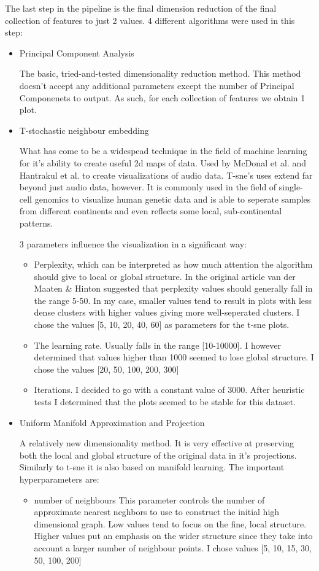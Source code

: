 \documentclass[11pt]{article}
\begin{document}
The last step in the pipeline is the final dimension reduction of the final collection of features to just 2 values. 4 different algorithms were used in this step:
\begin{itemize}
\item Principal Component Analysis

The basic, tried-and-tested dimensionality reduction method. This method doesn't accept any additional parameters except the number of Principal Componenets to output. As such, for each collection of features we obtain 1 plot.
\item T-stochastic neighbour embedding

What has come to be a widespead technique in the field of machine learning for it's ability to create useful 2d maps of data. Used by McDonal et al.  and Hantrakul et al. to create visualizations of audio data. T-sne's uses extend far beyond just audio data, however. It is commonly used in the field of single-cell genomics to visualize human genetic data \cite{doi:10.1142/S0219720017500172} and is able to seperate samples from different continents and even reflects some local, sub-continental patterns.

3 parameters influence the visualization in a significant way:
\begin{itemize}
\item Perplexity, which can be interpreted as how much attention the algorithm should give to local or global structure. In the original article van der Maaten \& Hinton suggested that perplexity values should generally fall in the range 5-50. In my case, smaller values tend to result in plots with less dense clusters with higher values giving more well-seperated clusters. I chose the values [5, 10, 20, 40, 60] as parameters for the t-sne plots.
\item The learning rate. Usually falls in the range [10-10000]. I however determined that values higher than 1000 seemed to lose global structure. I chose the values [20, 50, 100, 200, 300]
\item Iterations. I decided to go with a constant value of 3000. After heuristic tests I determined that the plots seemed to be stable for this dataset.
\end{itemize}

\item Uniform Manifold Approximation and Projection

A relatively new dimensionality method. It is very effective at preserving both the local and global structure of the original data in it's projections. Similarly to t-sne it is also based on manifold learning. The important hyperparameters are:
\begin{itemize}
\item number of neighbours
This parameter controls the number of approximate nearest neghbors to use to construct the initial high dimensional graph. Low values tend to focus on the fine, local structure. Higher values put an emphasis on the wider structure since they take into account a larger number of neighbour points. I chose values [5, 10, 15, 30, 50, 100, 200]


\end{itemize}
\end{itemize}
\end{document}
